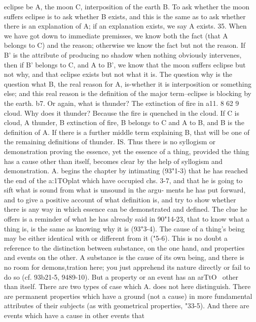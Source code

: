 {{{{{{{{{{{{{{{{{{{{{{{{{{{{{{{eclipse be A, the moon C, interposition of the earth B. To ask
whether the moon suffers eclipse is to ask whether B exists, and
this is the same as to ask whether there is an explanation of A;
if an explanation exists, we say A exists.
35. When we have got down to immediate premisses, we know
both the fact (that A belongs to C) and the reason; otherwise
we know the fact but not the reason. If B' is the attribute of
producing no shadow when nothing obviously intervenes, then
if B' belongs to C, and A to B', we know that the moon suffers
eclipse but not why, and that eclipse exists but not what it is.
The question why is the question what B, the real reason for
A, is-whether it is interposition or something else; and this
real reason is the definition of the major term--eclipse is blocking
by the earth.
b7. Or again, what is thunder? The extinction of fire in a11. 8
62 9
cloud. Why does it thunder? Because the fire is quenched in
the cloud. If C is cloud, A thunder, B extinction of fire, B belongs
to C and A to B, and B is the definition of A. If there is a further
middle term explaining B, that will be one of the remaining
definitions of thunder.
IS. Thus there is no syllogism or demonstration proving the
essence, yet the essence of a thing, provided the thing has a cause
other than itself, becomes clear by the help of syllogism and
demonstration.
A. begins the chapter by intimating (93"1-3) that he has reached
the end of the a:1TOplat which have occupied chs. 3-7, and that he
is going to sift what is sound from what is unsound in the argu-
ments he has put forward, and to give a positive account of what
definition is, and try to show whether there is any way in which
essence can be demonstrated and defined. The clue he offers is
a reminder of what he has already said in 90"14-23, that to know
what a thing is, is the same as knowing why it is (93"3-4). The
cause of a thing's being may be either identical with or different
from it ("5-6). This is no doubt a reference to the distinction
between substance, on the one hand, and properties and events
on the other. A substance is the cause of its own being, and there
is no room for demons,tration here; you just apprehend its nature
directly or fail to do so (cf. 93b21-5, 9489-10). But a property or
an event has an arTtO~ other than itself. There are two types of
case which A. does not here distinguish. There are permanent
properties which have a ground (not a cause) in more fundamental
attributes of their subjects (as with geometrical properties, "33-5).
And there are events which have a cause in other events that
}}}}}}}}}}}}}}}}}}}}}}}}}}}}}}}
